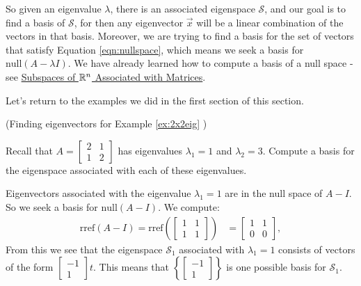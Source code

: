 \documentclass{ximera}
\begin{document}
So given an eigenvalue $\lambda$, there is an associated eigenspace $\mathcal{S}$, and our goal is to find a basis of $\mathcal{S}$, for then any eigenvector $\vec{x}$ will be a linear combination of the vectors in that basis.  Moreover, we are trying to find a basis for the set of vectors that satisfy Equation \ref{eqn:nullspace}, which means we seek a basis for $\mbox{null}(A-\lambda I)$.  We have already learned how to compute a basis of a null space - see \href{https://ximera.osu.edu/oerlinalg/LinearAlgebra/VSP-0040/main}{Subspaces of $\mathbb{R}^n$ Associated with Matrices}.

Let's return to the examples we did in the first section of this section.

\begin{example}\label{ex:eigvect2x2eig} (Finding eigenvectors for Example \ref{ex:2x2eig} ) 

Recall that $A=\begin{bmatrix} 2& 1\\ 1&2
\end{bmatrix}$ has eigenvalues $\lambda_1=1$ and $\lambda_2=3$.  Compute a basis for the eigenspace associated with each of these eigenvalues.
\begin{explanation}
Eigenvectors associated with the eigenvalue $\lambda_1=1$ are in the null space of $A-I$.  So we seek a basis for $\mbox{null}(A-I)$.  We compute:
\begin{align*}\mbox{rref}(A-I)=\mbox{rref}\left(\begin{bmatrix}1&1\\1&1\end{bmatrix}\right)&=\begin{bmatrix}1&1\\0&0\end{bmatrix},
\end{align*}
From this we see that the eigenspace $\mathcal{S}_1$ associated with $\lambda_1=1$ consists of vectors of the form $\begin{bmatrix}-1\\1\end{bmatrix}t$.
This means that $\left\{\begin{bmatrix}-1\\1\end{bmatrix}\right\}$ is one possible basis for $\mathcal{S}_1$.


\end{explanation}
\end{example}
\end{document}
